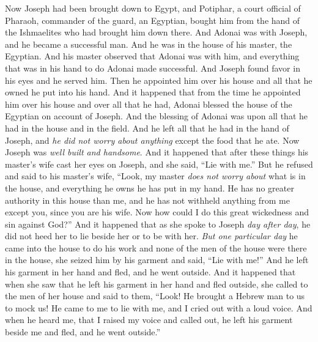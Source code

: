 \begin{biblechapter} %
 Now Joseph had been brought down to Egypt, and Potiphar, a court official of Pharaoh, commander of the guard, an Egyptian, bought him from the hand of the Ishmaelites who had brought him down there.
\verse And Adonai was with Joseph, and he became a successful man. And he was in the house of his master, the Egyptian.
\verse And his master observed that Adonai was with him, and everything that was in his hand to do Adonai made successful.
\verse And Joseph found favor in his eyes and he served him. Then he appointed him over his house and all that he owned he put into his hand.
\verse And it happened that from the time he appointed him over his house and over all that he had, Adonai blessed the house of the Egyptian on account of Joseph. And the blessing of Adonai was upon all that he had in the house and in the field.
\verse And he left all that he had in the hand of Joseph, and \textit{he did not worry about anything} except the food that he ate. Now Joseph was \textit{well built and handsome}.
\verse And it happened that after these things his master’s wife cast her eyes on Joseph, and she said, “Lie with me.”
\verse But he refused and said to his master’s wife, “Look, my master \textit{does not worry about} what is in the house, and everything he owns he has put in my hand.
\verse He has no greater authority in this house than me, and he has not withheld anything from me except you, since you are his wife. Now how could I do this great wickedness and sin against God?”
\verse And it happened that as she spoke to Joseph \textit{day after day}, he did not heed her to lie beside her or to be with her.
\verse \textit{But one particular day} he came into the house to do his work and none of the men of the house were there in the house,
\verse she seized him by his garment and said, “Lie with me!” And he left his garment in her hand and fled, and he went outside.
\verse And it happened that when she saw that he left his garment in her hand and fled outside,
\verse she called to the men of her house and said to them, “Look! He brought a Hebrew man to us to mock us! He came to me to lie with me, and I cried out with a loud voice.
\verse And when he heard me, that I raised my voice and called out, he left his garment beside me and fled, and he went outside.”

\end{biblechapter}
